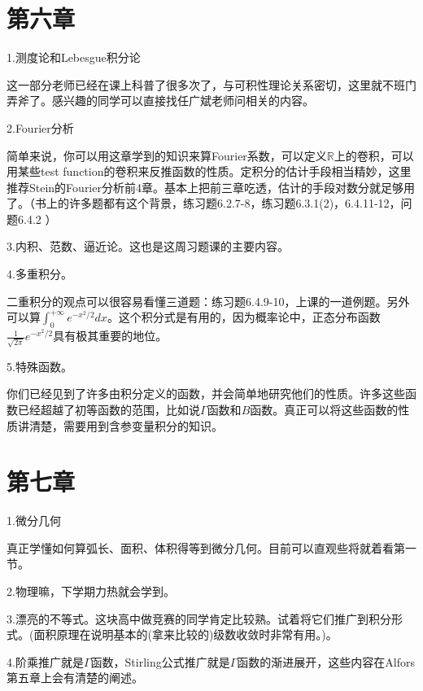 \documentclass{ctexart}
\begin{document}
\section{第六章}

1.测度论和Lebesgue积分论

这一部分老师已经在课上科普了很多次了，与可积性理论关系密切，这里就不班门弄斧了。感兴趣的同学可以直接找任广斌老师问相关的内容。

2.Fourier分析

简单来说，你可以用这章学到的知识来算Fourier系数，可以定义$\mathbb{R}$上的卷积，可以用某些test function的卷积来反推函数的性质。定积分的估计手段相当精妙，这里推荐Stein的Fourier分析前4章。基本上把前三章吃透，估计的手段对数分就足够用了。（书上的许多题都有这个背景，练习题6.2.7-8，练习题6.3.1(2)，6.4.11-12，问题6.4.2	）

3.内积、范数、逼近论。这也是这周习题课的主要内容。

4.多重积分。

二重积分的观点可以很容易看懂三道题：练习题6.4.9-10，上课的一道例题。另外可以算$\int_{0}^{+\infty}e^{-x^2/2}dx$。这个积分式是有用的，因为概率论中，正态分布函数$\displaystyle\frac{1}{\sqrt{2\pi}}e^{-x^2/2}$具有极其重要的地位。
		
5.特殊函数。

你们已经见到了许多由积分定义的函数，并会简单地研究他们的性质。许多这些函数已经超越了初等函数的范围，比如说$\Gamma$函数和$B$函数。真正可以将这些函数的性质讲清楚，需要用到含参变量积分的知识。
		
\section{第七章}
1.微分几何

真正学懂如何算弧长、面积、体积得等到微分几何。目前可以直观些将就着看第一节。

2.物理嘛，下学期力热就会学到。

3.漂亮的不等式。这块高中做竞赛的同学肯定比较熟。试着将它们推广到积分形式。(面积原理在说明基本的(拿来比较的)级数收敛时非常有用。)。

4.阶乘推广就是$\Gamma$函数，Stirling公式推广就是$\Gamma$函数的渐进展开，这些内容在Alfors第五章上会有清楚的阐述。
	
	
\end{document}
